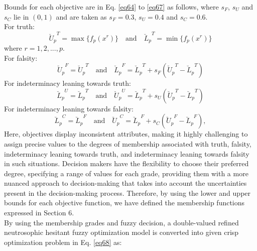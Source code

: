 \documentclass[a4paper]{elsarticle}
\begin{document}
{%
\noindent Bounds for each objective are in Eq. \ref{eq64} to \ref{eq67} as follows, where $s_F$, $s_U$ and
$s_C$ lie in $(0,1)$ and are taken as $s_F=0.3$, $s_U=0.4$ and $s_C=0.6$.\\
For truth:
\begin{equation}
\label{eq64}
{\breve{U}_p}^{T} = \max\{f_p(x^r)\} \quad \text{and} \quad {\breve{L}_p}^{T} = \min\{f_p(x^r)\}
\end{equation}
\noindent where $r=1,2,...,p$.\\
For falsity:
\begin{equation}
\label{eq65}
{{\breve{U}}_p}^{F}={\breve{U}_p}^{T} \quad \text{and} \quad {\breve{L}_p}^{F}={\breve{L}_p}^{T}+ s_F ({\breve{U}_p}^{T}-{\breve{L}_p}^{T})
\end{equation}
For indeterminacy leaning towards truth:
\begin{equation}
\label{eq66}
{\breve{L}_p}^{U}={\breve{L}_p}^{T}\quad \text{and} \quad {\breve{U}_p}^{U}={\breve{L}_p}^{T}+s_U({\breve{U}_p}^{T}-{\breve{L}_p}^{T})
\end{equation}
For indeterminacy leaning towards falsity:
\begin{equation}
\label{eq67}
{\breve{L}_p}^{C}={\breve{L}_p}^{F}\quad \text{and} \quad {\breve{U}_p}^{C}={\breve{L}_p}^{F}+s_C({\breve{U}_p}^{F}-{\breve{L}_p}^{F}),
\end{equation}
\noindent Here, objectives display inconsistent attributes, making it highly challenging to assign precise values to the degrees of membership associated with truth, falsity, indeterminacy leaning towards truth, and indeterminacy leaning towards falsity in such situations. Decision makers have the flexibility to choose their preferred degree, specifying a range of values for each grade, providing them with a more nuanced approach to decision-making that takes into account the uncertainties present in the decision-making process. Therefore, by using the lower and upper bounds for each objective function, we have defined the membership functions expressed in Section $6$.\\
By using the membership grades and fuzzy decision, a double-valued refined neutrosophic hesitant fuzzy optimization model is converted into given crisp optimization problem in Eq. \ref{eq68} as:
\begin{equation}

\end{equation}}
\end{document}
